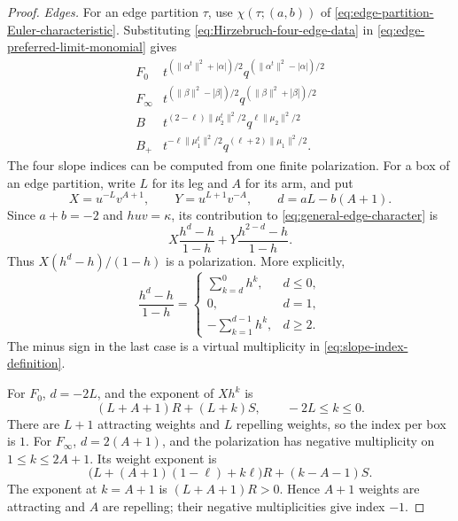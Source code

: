 \documentclass{amsart}
\theoremstyle{definition}
\numberwithin{equation}{section}
\begin{document}
\begin{proof}
\emph{Edges.}  For an edge partition \(\tau\), use \(\chi(\tau;(a,b))\) of \eqref{eq:edge-partition-Euler-characteristic}.  Substituting \eqref{eq:Hirzebruch-four-edge-data} in \eqref{eq:edge-preferred-limit-monomial} gives
\begin{equation}
\begin{array}{c|c}
F_0&
t^{(\|\alpha^t\|^2+|\alpha|)/2}
q^{(\|\alpha^t\|^2-|\alpha|)/2}\\[2pt]
F_\infty&
t^{(\|\beta\|^2-|\beta|)/2}
q^{(\|\beta\|^2+|\beta|)/2}\\[2pt]
B&
t^{(2-\ell)\|\mu_2^t\|^2/2}
q^{\ell\|\mu_2\|^2/2}\\[2pt]
B_+&
t^{-\ell\|\mu_1^t\|^2/2}
q^{(\ell+2)\|\mu_1\|^2/2}.
\end{array}
\label{eq:Hirzebruch-four-edge-monomials}
\end{equation}
The four slope indices can be computed from one finite polarization.  For a box of an edge partition, write \(L\) for its leg and \(A\) for its arm, and put
\[
 X=u^{-L}v^{A+1},\qquad Y=u^{L+1}v^{-A},\qquad
 d=aL-b(A+1).
\]
Since \(a+b=-2\) and \(huv=\kappa\), its contribution to \eqref{eq:general-edge-character} is
\[
 X\frac{h^d-h}{1-h}+Y\frac{h^{2-d}-h}{1-h}.
\]
Thus \(X(h^d-h)/(1-h)\) is a polarization.  More explicitly,
\[
 \frac{h^d-h}{1-h}=
 \begin{cases}
 \displaystyle\sum_{k=d}^{0}h^k,&d\leq0,\\[3pt]
 0,&d=1,\\[2pt]
 \displaystyle-\sum_{k=1}^{d-1}h^k,&d\geq2.
 \end{cases}
\]
The minus sign in the last case is a virtual multiplicity in \eqref{eq:slope-index-definition}.

For \(F_0\), \(d=-2L\), and the exponent of \(Xh^k\) is
\[
 (L+A+1)R+(L+k)S,\qquad -2L\leq k\leq0.
\]
There are \(L+1\) attracting weights and \(L\) repelling weights, so the index per box is \(1\).
For \(F_\infty\), \(d=2(A+1)\), and the polarization has negative multiplicity on \(1\leq k\leq2A+1\).  Its weight exponent is
\[
 \bigl(L+(A+1)(1-\ell)+k\ell\bigr)R+(k-A-1)S.
\]
The exponent at \(k=A+1\) is \((L+A+1)R>0\).  Hence \(A+1\) weights are attracting and \(A\) are repelling; their negative multiplicities give index \(-1\).


\end{proof}
\end{document}
